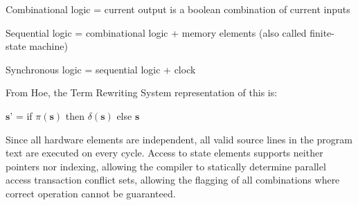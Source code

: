 Combinational logic = current output is a boolean combination of current inputs

Sequential logic = combinational logic + memory elements
(also called finite-state machine)

Synchronous logic = sequential logic + clock


From Hoe\cite{Hoe:Thesis}, the Term Rewriting System representation of this is:

$\textbf{s'}$ = if $\pi(\textbf{s})$ then $\delta(\textbf{s})$ else $\textbf{s}$

Since all hardware elements are independent, all valid source lines in the
program text are executed on every cycle.
Access to state elements supports neither pointers nor indexing, allowing the
compiler to statically determine parallel access transaction conflict sets,
allowing the flagging of all combinations where correct operation cannot
be guaranteed.

